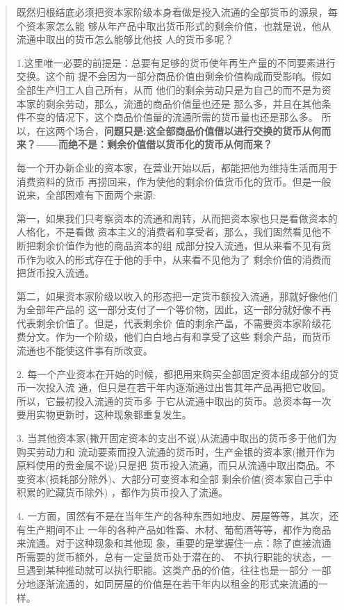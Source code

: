 \begin{quotation}
  既然归根结底必须把资本家阶级本身看做是投入流通的全部货币的源泉，每个资本家怎么能
  够从年产品中取出货币形式的剩余价值，也就是说，他从流通中取出的货币怎么能够比他技
  人的货币多呢？

  1.这里唯一必要的前提是：总要有足够的货币使年再生产量的不同要素进行交换。这个前
  提不会因为一部分商品价值由剩余价值构成而受影响。假如全部生产归工人自己所有，从而
  他们的剩余劳动只是为自己的而不是为资本家的剩余劳动，那么，流通的商品价值量也还是
  那么多，并且在其他条件不变的情况下，这个商品价值量的流通所需的货币量也还是那么多。
  所以，在这两个场合，\textbf{问题只是:这全部商品价值借以进行交换的货币从何而
    来？——而绝不是：剩余价值借以货币化的货币从何而来？}

  每一个开办新企业的资本家，在营业开始以后，都能把他为维持生活而用于消费资料的货币
  再捞回来，作为使他的剩余价值货币化的货币。但是一般说来，全部困难有下面两个来源:

  第一，如果我们只考察资本的流通和周转，从而把资本家也只是看做资本的人格化，不是看做
  资本主义的消费者和享受者，那么，我们固然看见他不断把剩余价值作为他的商品资本的组
  成部分投入流通，但从来看不见有货币作为收入的形式存在于他的手中，从来看不见他为了
  剩余价值的消费而把货币投入流通。

  第二，如果资本家阶级以收入的形态把一定货币额投入流通，那就好像他们为全部年产品的
  这一部分支付了一个等价物，因此，这一部分就好像不再代表剩余价值了。但是，代表剩余价
  值的剩余产晶，不需要资本家阶级花费分文。作为一个阶级，他们白白地占有和享受了这些
  剩余产品，而货币流通也不能使这件事有所改变。

  2. 每一个产业资本在开始的时候，都把用来购买全部固定资本组成部分的货币一次投入流
  通，但只是在若干年内逐渐通过出售其年产品再把它收回。所以，它最初投入流通的货币多
  于它从流通中取出的货币。总资本每一次要用实物更新时，这种现象都重复发生。

  3. 当其他资本家(撇开固定资本的支出不说)从流通中取出的货币多于他们为购买劳动力和
  流动要素而投入流通的货币时，生产金银的资本家(撇开作为原料使用的贵金属不说)只是把
  货币投入流通，而只从流通中取出商品。不变资本(损耗部分除外)、大部分可变资本和全部
  剩余价值(资本家自己手中积累的贮藏货币除外) ，都作为货币投入了流通。

  4. 一方面，固然有不是在当年生产的各种东西如地皮、房屋等等，其次，还有生产期间不止
  一年的各种产品如牲畜、木材、葡萄酒等等，都作为商品来流通。对于这种现象和其他现
  象，重要的是掌握住一点：除了直接流通所需要的货币额外，总有一定量货币处于潜在的、
  不执行职能的状态，一旦遇到某种推动就可以执行职能。这类产品的价值，往往也是一部分
  一部分地逐渐流通的，如同房屋的价值是在若干年内以租金的形式来流通的一样。 
  
\end{quotation}






